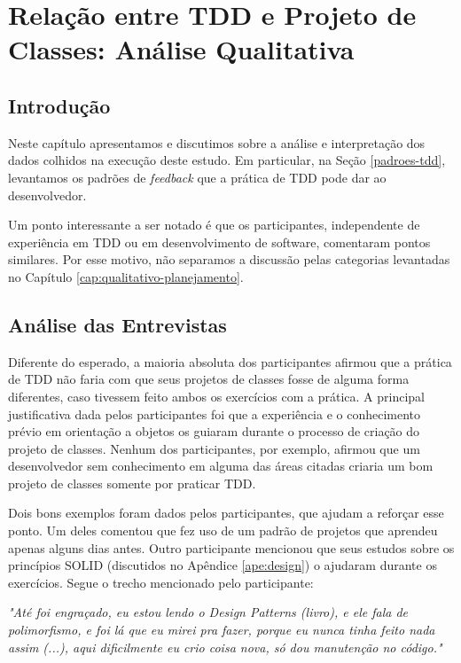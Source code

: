 \chapter{Relação entre TDD e Projeto de Classes: Análise Qualitativa}
\label{cap:discussao}

\section{Introdução}

Neste capítulo apresentamos e discutimos sobre a análise e interpretação dos dados colhidos
na execução deste estudo. Em particular, na Seção 
\ref{padroes-tdd}, levantamos os padrões de \textit{feedback} que a prática de TDD
pode dar ao desenvolvedor.

Um ponto interessante a ser notado é que os participantes, independente de experiência
em TDD ou em desenvolvimento de software, comentaram pontos similares. Por esse motivo,
não separamos a discussão pelas categorias levantadas no Capítulo \ref{cap:qualitativo-planejamento}.

\section{Análise das Entrevistas}

Diferente do esperado, a maioria absoluta dos participantes afirmou que 
a prática de TDD não faria com que seus projetos de classes fosse de alguma forma diferentes, caso tivessem
feito ambos os exercícios com a prática.
A principal justificativa dada pelos participantes foi que a experiência e o conhecimento prévio
em orientação a objetos os guiaram durante o processo de criação do projeto de classes. Nenhum dos
participantes, por exemplo, afirmou que um desenvolvedor sem conhecimento em alguma das áreas
citadas criaria um bom projeto de classes somente por praticar TDD.

Dois bons exemplos foram dados pelos participantes, que ajudam a reforçar esse ponto. Um deles
comentou que fez uso de um padrão de projetos \cite{gof} que aprendeu apenas alguns dias antes.
Outro participante mencionou que seus estudos sobre os princípios SOLID (discutidos no Apêndice \ref{ape:design})
o ajudaram durante os exercícios. Segue o trecho mencionado pelo participante:

\begin{framed}
\textit{"Até foi engraçado, eu estou lendo o Design Patterns (livro), e ele fala de polimorfismo, e foi
lá que eu mirei pra fazer, porque eu nunca tinha feito nada assim (...), aqui dificilmente eu crio
coisa nova, só dou manutenção no código."}
\end{framed}

